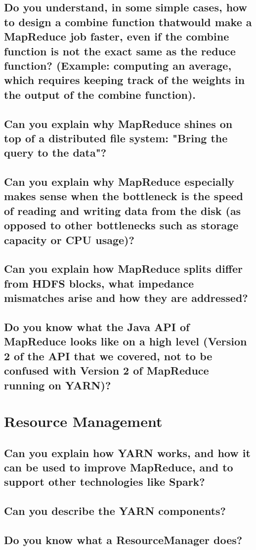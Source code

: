 \documentclass{article}
\begin{document}
\subsection{Do you understand, in some simple cases, how to design a combine function thatwould make a MapReduce job faster, even if the combine function is not the exact same as the reduce function? (Example: computing an average, which requires keeping track of the weights in the output of the combine function).}
\subsection{Can you explain why MapReduce shines on top of a distributed file system: "Bring the query to the data"?}
\subsection{Can you explain why MapReduce especially makes sense when the bottleneck is the speed of reading and writing data from the disk (as opposed to other bottlenecks such as storage capacity or CPU usage)?}
\subsection{Can you explain how MapReduce splits differ from HDFS blocks, what impedance mismatches arise and how they are addressed?}
\subsection{Do you know what the Java API of MapReduce looks like on a high level (Version 2 of the API that we covered, not to be confused with Version 2 of MapReduce running on YARN)?}

\pagebreak

\section{Resource Management}
\subsection{Can you explain how YARN works, and how it can be used to improve MapReduce, and to support other technologies like Spark?}
\subsection{Can you describe the YARN components?}
\subsection{Do you know what a ResourceManager does?}
\end{document}
